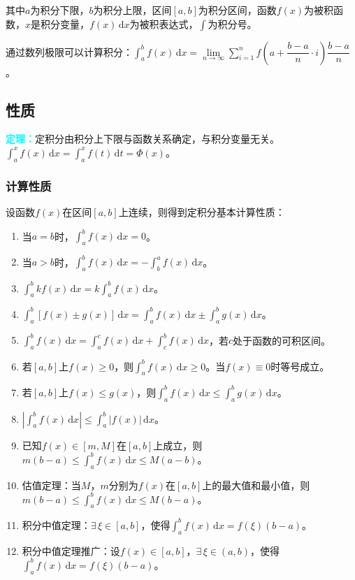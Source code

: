 \documentclass[UTF8, 12pt]{ctexart}
\begin{document}
        其中$a$为积分下限，$b$为积分上限，区间$[a,b]$为积分区间，函数$f(x)$为被积函数，$x$是积分变量，$f(x)\,\textrm{d}x$为被积表达式，$\int$为积分号。\medskip

        通过数列极限可以计算积分：$\displaystyle{\int_a^bf(x)\,\textrm{d}x=\lim\limits_{n\to\infty}\sum\limits_{i=1}^nf\left(a+\dfrac{b-a}{n}\cdot i\right)\dfrac{b-a}{n}}$。

        \subsection{性质}

        \textcolor{aqua}{\textbf{定理：}}定积分由积分上下限与函数关系确定，与积分变量无关。$\int_a^xf(x)\,\textrm{d}x=\int_a^xf(t)\,\textrm{d}t=\varPhi(x)$。

        \subsubsection{计算性质}

        设函数$f(x)$在区间$[a,b]$上连续，则得到定积分基本计算性质：

        \begin{enumerate}
            \item 当$a=b$时，$\int_a^bf(x)\,\textrm{d}x=0$。
            \item 当$a>b$时，$\int_a^bf(x)\,\textrm{d}x=-\int_b^af(x)\,\textrm{d}x$。
            \item $\int_a^bkf(x)\,\textrm{d}x=k\int_a^bf(x)\,\textrm{d}x$。
            \item $\int_a^b[f(x)\pm g(x)]\,\textrm{d}x=\int_a^bf(x)\,\textrm{d}x\pm\int_a^bg(x)\,\textrm{d}x$。
            \item $\int_a^bf(x)\,\textrm{d}x=\int_a^cf(x)\,\textrm{d}x+\int_c^bf(x)\,\textrm{d}x$，若$c$处于函数的可积区间。
            \item 若$[a,b]$上$f(x)\geqslant 0$，则$\int_a^bf(x)\,\textrm{d}x\geqslant 0$。当$f(x)\equiv0$时等号成立。
            \item 若$[a,b]$上$f(x)\leqslant g(x)$，则$\int_a^bf(x)\,\textrm{d}x\leqslant\int_a^bg(x)\,\textrm{d}x$。
            \item $\left\vert\int_a^bf(x)\,\textrm{d}x\right\vert\leqslant\int_a^b\vert f(x)\vert\,\textrm{d}x$。
            \item 已知$f(x)\in[m,M]$在$[a,b]$上成立，则$m(b-a)\leqslant\int_a^bf(x)\,\textrm{d}x\leqslant M(a-b)$。
            \item 估值定理：当$M$，$m$分别为$f(x)$在$[a,b]$上的最大值和最小值，则$m(b-a)\leqslant\int_a^bf(x)\,\textrm{d}x\leqslant M(b-a)$。
            \item 积分中值定理：$\exists\,\xi\in[a,b]$，使得$\int_a^bf(x)\,\textrm{d}x=f(\xi)(b-a)$。
            \item 积分中值定理推广：设$f(x)\in[a,b]$，$\exists\,\xi\in(a,b)$，使得$\int_a^bf(x)\,\textrm{d}x=f(\xi)(b-a)$。
        \end{enumerate}
\end{document}
